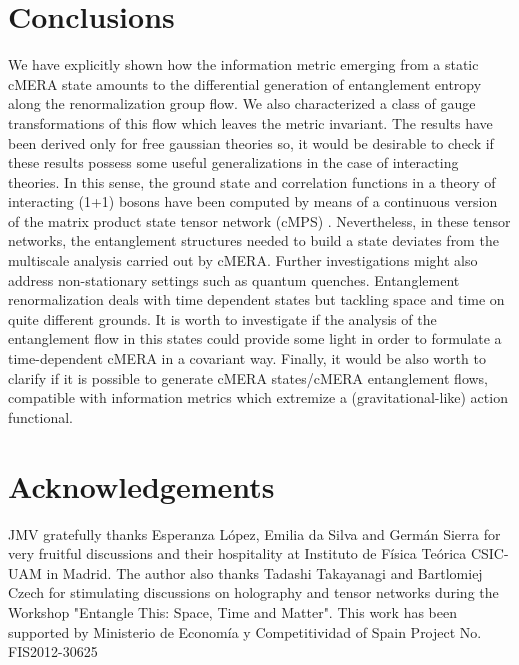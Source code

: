 \documentclass[preprint,aps]{revtex4}
\begin{document}
\section{Conclusions}
\label{conclusions}
We have explicitly shown how the information metric emerging from a static cMERA state amounts to the differential generation of entanglement entropy along the renormalization group flow. We also characterized a class of gauge transformations of this flow which leaves the metric invariant. The results have been derived  only for free gaussian theories so, it would be desirable to check if these results possess some useful generalizations in the case of interacting theories. In this sense, the ground state and correlation functions in a theory of interacting (1+1) bosons have been computed by means of a continuous version of the matrix product state tensor network (cMPS) \cite{cMPS}. Nevertheless, in these tensor networks, the entanglement structures needed to build a state deviates from the multiscale analysis carried out by cMERA. Further investigations might also address non-stationary settings such as quantum quenches. Entanglement renormalization deals with time dependent states \cite{taka1} but tackling space and time on quite different grounds. It is worth to investigate if the analysis of the entanglement flow in this states could provide some light in order to formulate a time-dependent cMERA in a covariant way. Finally, it would be also worth to clarify if it is possible to generate cMERA states/cMERA entanglement flows, compatible with information metrics which extremize a (gravitational-like) action functional.

\section*{Acknowledgements}
JMV gratefully thanks Esperanza L\'opez, Emilia da Silva and Germ\'an Sierra for very fruitful discussions and their hospitality at Instituto de F\'isica Te\'orica CSIC-UAM in Madrid. The author also thanks  Tadashi Takayanagi and Bartlomiej Czech for stimulating discussions on holography and tensor networks during the Workshop "Entangle This: Space, Time and Matter". This work has been supported by  Ministerio de Econom\'ia y Competitividad of Spain Project No. FIS2012-30625
\end{document}
